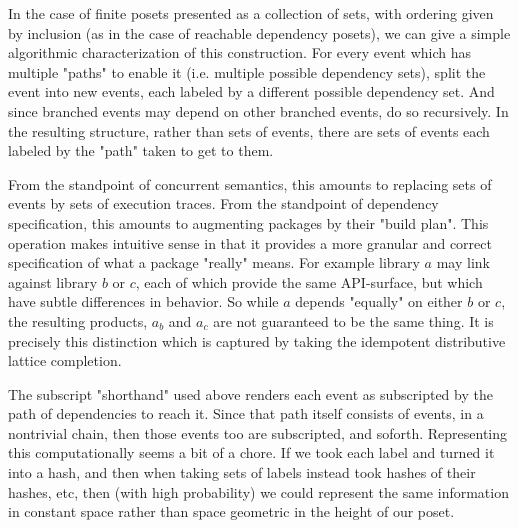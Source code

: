 \documentclass[hoptionsi,review,format=acmsmall]{acmart}
\theoremstyle{definition}
\begin{document}
In the case of finite posets presented as a collection of sets, with ordering given by inclusion (as in the case of reachable dependency posets), we can give a simple algorithmic characterization of this construction. For every event which has multiple "paths" to enable it (i.e. multiple possible dependency sets), split the event into new events, each labeled by a different possible dependency set. And since branched events may depend on other branched events, do so recursively. In the resulting structure, rather than sets of events, there are sets of events each labeled by the "path" taken to get to them. 

From the standpoint of concurrent semantics, this amounts to replacing sets of events by sets of execution traces. From the standpoint of dependency specification, this amounts to augmenting packages by their "build plan". This operation makes intuitive sense in that it provides a more granular and correct specification of what a package "really" means. For example library \(a\) may link against library \(b\) or \(c\), each of which provide the same API-surface, but which have subtle differences in behavior. So while \(a\) depends "equally" on either \(b\) or \(c\), the resulting products, \(a_b\) and \(a_c\) are not guaranteed to be the same thing. It is precisely this distinction which is captured by taking the idempotent distributive lattice completion.

The subscript "shorthand" used above renders each event as subscripted by the path of dependencies to reach it. Since that path itself consists of events, in a nontrivial chain, then those events too are subscripted, and soforth. Representing this computationally seems a bit of a chore. If we took each label and turned it into a hash, and then when taking sets of labels instead took hashes of their hashes, etc, then (with high probability) we could represent the same information in constant space rather than space geometric in the height of our poset.
\end{document}
